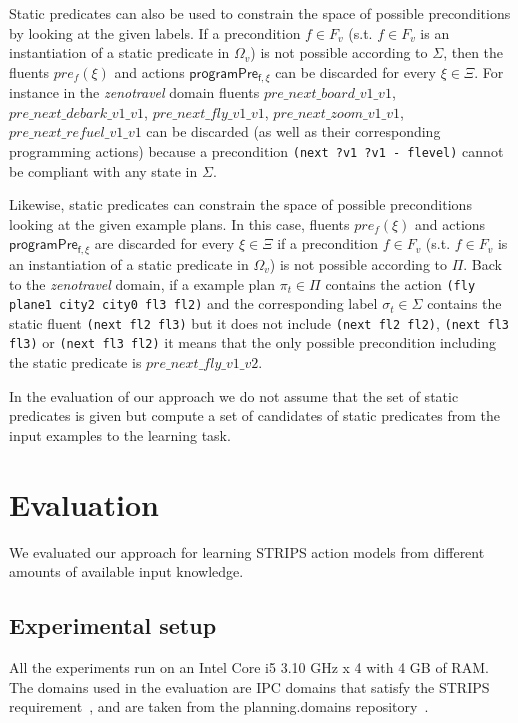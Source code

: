 \documentclass[letterpaper]{article} %
\begin{document}
Static predicates can also be used to constrain the space of possible preconditions by looking at the given labels. If a precondition $f\in F_v$ (s.t. $f\in F_v$ is an instantiation of a static predicate in $\Omega_v$) is not possible according to $\Sigma$, then the fluents $pre_f(\xi)$ and actions $\mathsf{programPre_{f,\xi}}$ can be discarded for every $\xi\in\Xi$. For instance in the {\em zenotravel} domain fluents $pre\_next\_board\_v1\_v1$, $pre\_next\_debark\_v1\_v1$, $pre\_next\_fly\_v1\_v1$, $pre\_next\_zoom\_v1\_v1$, $pre\_next\_refuel\_v1\_v1$ can be discarded (as well as their corresponding programming actions) because a precondition {\tt\small(next ?v1 ?v1 - flevel)} cannot be compliant with any state in $\Sigma$.

Likewise, static predicates can constrain the space of possible preconditions looking at the given example plans. In this case, fluents $pre_f(\xi)$ and actions $\mathsf{programPre_{f,\xi}}$ are discarded for every $\xi\in\Xi$ if a precondition $f\in F_v$ (s.t. $f\in F_v$ is an instantiation of a static predicate in $\Omega_v$) is not possible according to $\Pi$. Back to the {\em zenotravel} domain, if a example plan $\pi_t\in \Pi$ contains the action {\tt\small (fly plane1 city2 city0 fl3 fl2)} and the corresponding label $\sigma_t\in\Sigma$ contains the static fluent {\tt\small (next fl2 fl3)} but it does not include {\tt\small (next fl2 fl2)}, {\tt\small (next fl3 fl3)} or {\tt\small (next fl3 fl2)} it means that the only possible precondition including the static predicate is $pre\_next\_fly\_v1\_v2$.

In the evaluation of our approach we do not assume that the set of static predicates is given but compute a set of candidates of static predicates from the input examples to the learning task.


\section{Evaluation}
We evaluated our approach for learning STRIPS action models from different amounts of available input knowledge.

\subsection{Experimental setup}
All the experiments run on an Intel Core i5 3.10 GHz x 4 with 4 GB of RAM. The domains used in the evaluation are IPC domains that satisfy the STRIPS requirement~\cite{fox2003pddl2}, and are taken from the {\sc planning.domains} repository~\cite{muise2016planning}.
\end{document}
